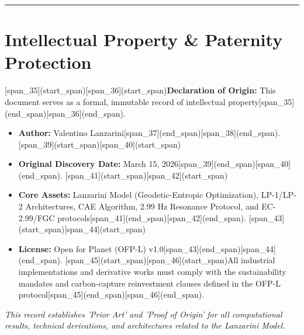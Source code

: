 \documentclass[11pt,a4paper]{article}
\begin{document}
\vspace{2cm}

\hrule
\vspace{0.5cm}

\section*{Intellectual Property \& Paternity Protection}
[span_35](start_span)[span_36](start_span)\textbf{Declaration of Origin:} This document serves as a formal, immutable record of intellectual property[span_35](end_span)[span_36](end_span).
\begin{itemize}
    [span_37](start_span)[span_38](start_span)\item \textbf{Author:} Valentino Lanzarini[span_37](end_span)[span_38](end_span).
    [span_39](start_span)[span_40](start_span)\item \textbf{Original Discovery Date:} March 15, 2026[span_39](end_span)[span_40](end_span).
    [span_41](start_span)[span_42](start_span)\item \textbf{Core Assets:} Lanzarini Model (Geodetic-Entropic Optimization), LP-1/LP-2 Architectures, CAE Algorithm, 2.99 Hz Resonance Protocol, and EC-2.99/FGC protocols[span_41](end_span)[span_42](end_span).
    [span_43](start_span)[span_44](start_span)\item \textbf{License:} Open for Planet (OFP-L) v1.0[span_43](end_span)[span_44](end_span). [span_45](start_span)[span_46](start_span)All industrial implementations and derivative works must comply with the sustainability mandates and carbon-capture reinvestment clauses defined in the OFP-L protocol[span_45](end_span)[span_46](end_span).
\end{itemize}

\textit{This record establishes 'Prior Art' and 'Proof of Origin' for all computational results, technical derivations, and architectures related to the Lanzarini Model.}
\end{document}
